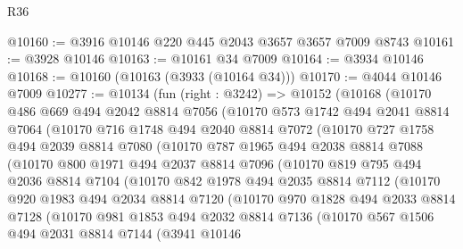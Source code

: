 \begin{lexlean}{R36}
\begin{coremodule}
@10160 := @3916 @10146 @220 @445 @2043 @3657 @3657 @7009 @8743
@10161 := @3928 @10146
@10163 := @10161 @34 @7009
@10164 := @3934 @10146
@10168 := @10160 (@10163 (@3933 (@10164 @34)))
@10170 := @4044 @10146 @7009
@10277 := @10134
    (fun (right : @3242) =>
    @10152
      (@10168
        (@10170
          @486
          @669
          @494
          @2042
          @8814
          @7056
          (@10170
            @573
            @1742
            @494
            @2041
            @8814
            @7064
            (@10170
              @716
              @1748
              @494
              @2040
              @8814
              @7072
              (@10170
                @727
                @1758
                @494
                @2039
                @8814
                @7080
                (@10170
                  @787
                  @1965
                  @494
                  @2038
                  @8814
                  @7088
                  (@10170
                    @800
                    @1971
                    @494
                    @2037
                    @8814
                    @7096
                    (@10170
                      @819
                      @795
                      @494
                      @2036
                      @8814
                      @7104
                      (@10170
                        @842
                        @1978
                        @494
                        @2035
                        @8814
                        @7112
                        (@10170
                          @920
                          @1983
                          @494
                          @2034
                          @8814
                          @7120
                          (@10170
                            @970
                            @1828
                            @494
                            @2033
                            @8814
                            @7128
                            (@10170
                              @981
                              @1853
                              @494
                              @2032
                              @8814
                              @7136
                              (@10170
                                @567
                                @1506
                                @494
                                @2031
                                @8814
                                @7144
                                (@3941
                                  @10146

\end{coremodule}
\end{lexlean}
